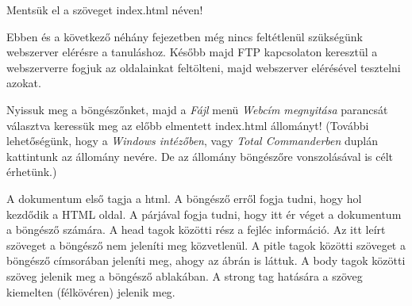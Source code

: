 \documentclass{thesis-ekf}
\theoremstyle{definition}
\begin{document}


Mentsük el a szöveget index.html néven!

Ebben és a következő néhány fejezetben még nincs feltétlenül szükségünk webszerver elérésre a tanuláshoz. Később majd FTP kapcsolaton keresztül a webszerverre fogjuk az oldalainkat feltölteni, majd webszerver elérésével tesztelni azokat.

Nyissuk meg a böngészőnket, majd a \emph{Fájl} menü \emph{Webcím megnyitása} parancsát választva keressük meg az előbb elmentett index.html állományt! (További lehetőségünk, hogy a \emph{Windows intézőben}, vagy \emph{Total Commanderben} duplán kattintunk az állomány nevére. De az állomány böngészőre vonszolásával is célt érhetünk.)

A dokumentum első tagja a html. A böngésző erről fogja tudni, hogy hol kezdődik a HTML oldal. A párjával fogja tudni, hogy itt ér véget a dokumentum a böngésző számára. A head tagok közötti rész a fejléc információ. Az itt leírt szöveget a böngésző nem jeleníti meg közvetlenül. A pitle tagok közötti szöveget a böngésző címsorában jeleníti meg, ahogy az ábrán is láttuk. A body tagok közötti szöveg jelenik meg a böngésző ablakában. A strong tag hatására a szöveg kiemelten (félkövéren) jelenik meg.
\end{document}
